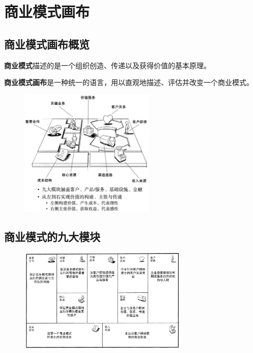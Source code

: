 \section{商业模式画布}

	\subsection{商业模式画布概览}
	\textbf{商业模式}描述的是一个组织创造、传递以及获得价值的基本原理。

	\textbf{商业模式画布}是一种统一的语言，用以直观地描述、评估并改变一个商业模式。

	\begin{figure}[H]
		\vspace{-0.5em}
		\centering
		\includegraphics[width=0.58\textwidth]{img/商业模式画布.png}
		\vspace{-0.5em}
	\end{figure}
	
	\subsection{商业模式的九大模块}
	\begin{figure}[H]
		\vspace{-0.5em}
		\centering
		\includegraphics[width=0.72\textwidth]{img/商业模式的九大模块.png}
		\vspace{-0.5em}
	\end{figure}

